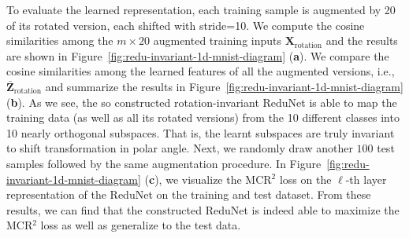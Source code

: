 \documentclass[../../book-main.tex]{subfiles}
\begin{document}
\begin{example}
To evaluate the learned representation, each training sample is augmented by 20 of its rotated version, each shifted with stride=10. We compute the cosine similarities among the $m \times 20$ augmented training inputs $\bm{X}_{\text{rotation}}$ and the results are shown in Figure~\ref{fig:redu-invariant-1d-mnist-diagram} (\textbf{a}). 
We compare the cosine similarities among the learned features of all the augmented versions, i.e., $\bar{\bm{Z}}_{\text{rotation}}$ and summarize the results in  Figure~\ref{fig:redu-invariant-1d-mnist-diagram} (\textbf{b}). 
As we see, the so constructed rotation-invariant ReduNet is able to  map the training data (as well as all its rotated versions) from the 10 different classes into 10 nearly orthogonal subspaces. That is, the learnt subspaces are truly invariant to shift transformation in polar angle.  Next, we randomly draw another $100$ test samples followed by the same augmentation procedure. 
In Figure~\ref{fig:redu-invariant-1d-mnist-diagram} (\textbf{c}), we visualize the MCR$^{2}$ loss on the  $\ell$-th layer representation of the ReduNet on the training and test dataset. From these results, we can find that the constructed ReduNet is indeed able to maximize the MCR$^{2}$ loss as well as generalize to the test data.




\end{example}
\end{document}
